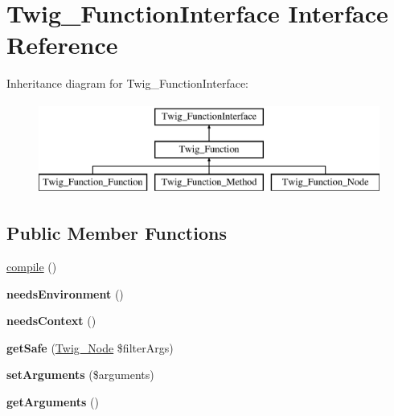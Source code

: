 \hypertarget{interfaceTwig__FunctionInterface}{}\section{Twig\+\_\+\+Function\+Interface Interface Reference}
\label{interfaceTwig__FunctionInterface}
Inheritance diagram for Twig\+\_\+\+Function\+Interface\+:\begin{figure}[H]
\begin{center}
\leavevmode
\includegraphics[height=3.000000cm]{interfaceTwig__FunctionInterface}
\end{center}
\end{figure}
\subsection*{Public Member Functions}
\begin{DoxyCompactItemize}
\item 
\hyperlink{interfaceTwig__FunctionInterface_ace3eea7c38a017341d8cf58d181bc625}{compile} ()
\item 
{\bfseries needs\+Environment} ()\hypertarget{interfaceTwig__FunctionInterface_a34452c23ecbb14753c4761439fa75e98}{}\label{interfaceTwig__FunctionInterface_a34452c23ecbb14753c4761439fa75e98}

\item 
{\bfseries needs\+Context} ()\hypertarget{interfaceTwig__FunctionInterface_a755b3b87ecb504d48d9b2073efe87340}{}\label{interfaceTwig__FunctionInterface_a755b3b87ecb504d48d9b2073efe87340}

\item 
{\bfseries get\+Safe} (\hyperlink{classTwig__Node}{Twig\+\_\+\+Node} \$filter\+Args)\hypertarget{interfaceTwig__FunctionInterface_a676bdb75dd26240f7f16d4b17908407d}{}\label{interfaceTwig__FunctionInterface_a676bdb75dd26240f7f16d4b17908407d}

\item 
{\bfseries set\+Arguments} (\$arguments)\hypertarget{interfaceTwig__FunctionInterface_ab22348160eb9e34a44adeef33cddcca1}{}\label{interfaceTwig__FunctionInterface_ab22348160eb9e34a44adeef33cddcca1}

\item 
{\bfseries get\+Arguments} ()\hypertarget{interfaceTwig__FunctionInterface_a172efa161928ea37c57c3c0f138658a6}{}\label{interfaceTwig__FunctionInterface_a172efa161928ea37c57c3c0f138658a6}

\end{DoxyCompactItemize}


